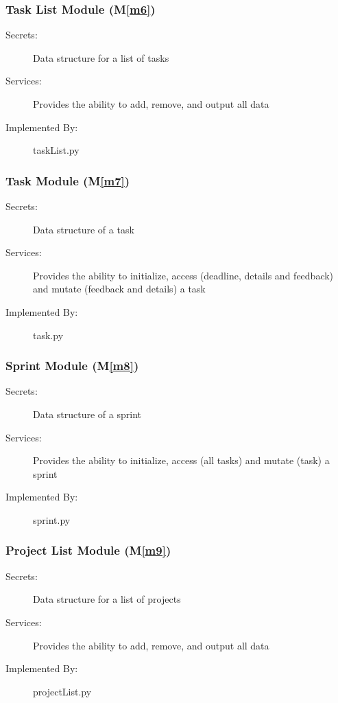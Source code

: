 \documentclass[12pt, titlepage]{article}
\newcommand{\mref}[1]{M\ref{#1}}
\begin{document}
\subsubsection{Task List Module (\mref{m6})}
\begin{description}
    \item[Secrets:] Data structure for a list of tasks
    \item[Services:] Provides the ability to add, remove, and output all data
    \item[Implemented By:] taskList.py
\end{description}

\subsubsection{Task Module (\mref{m7})}
\begin{description}
    \item[Secrets:] Data structure of a task
    \item[Services:] Provides the ability to initialize, access (deadline, details and feedback) and mutate (feedback and details) a task
    \item[Implemented By:] task.py
\end{description}

\subsubsection{Sprint Module (\mref{m8})}
\begin{description}
    \item[Secrets:] Data structure of a sprint
    \item[Services:] Provides the ability to initialize, access (all tasks) and mutate (task) a sprint
    \item[Implemented By:] sprint.py
\end{description}

\subsubsection{Project List Module (\mref{m9})}
\begin{description}
    \item[Secrets:] Data structure for a list of projects
    \item[Services:] Provides the ability to add, remove, and output all data
    \item[Implemented By:] projectList.py
\end{description}
\end{document}
